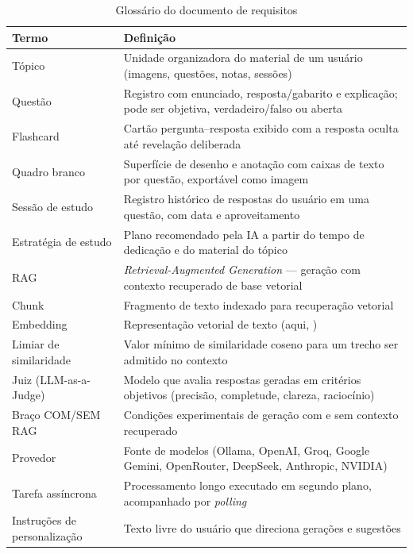 \begin{table}[H]
\centering
\setlength{\tabcolsep}{3pt}
\caption{Glossário do documento de requisitos}
\label{tab:req-glossario}
\begin{tabularx}{\textwidth}{|L{3.6cm}|Y|}
\hline
\textbf{Termo} & \textbf{Definição} \\
\hline
Tópico & Unidade organizadora do material de um usuário (imagens, questões, notas, sessões) \\
\hline
Questão & Registro com enunciado, resposta/gabarito e explicação; pode ser objetiva, verdadeiro/falso ou aberta \\
\hline
Flashcard & Cartão pergunta--resposta exibido com a resposta oculta até revelação deliberada \\
\hline
Quadro branco & Superfície de desenho e anotação com caixas de texto por questão, exportável como imagem \\
\hline
Sessão de estudo & Registro histórico de respostas do usuário em uma questão, com data e aproveitamento \\
\hline
Estratégia de estudo & Plano recomendado pela IA a partir do tempo de dedicação e do material do tópico \\
\hline
RAG & \emph{Retrieval-Augmented Generation} --- geração com contexto recuperado de base vetorial \\
\hline
Chunk & Fragmento de texto indexado para recuperação vetorial \\
\hline
Embedding & Representação vetorial de texto (aqui, \texttt{}) \\
\hline
Limiar de similaridade & Valor mínimo de similaridade coseno para um trecho ser admitido no contexto \\
\hline
Juiz (LLM-as-a-Judge) & Modelo que avalia respostas geradas em critérios objetivos (precisão, completude, clareza, raciocínio) \\
\hline
Braço COM/SEM RAG & Condições experimentais de geração com e sem contexto recuperado \\
\hline
Provedor & Fonte de modelos (Ollama, OpenAI, Groq, Google Gemini, OpenRouter, DeepSeek, Anthropic, NVIDIA) \\
\hline
Tarefa assíncrona & Processamento longo executado em segundo plano, acompanhado por \emph{polling} \\
\hline
Instruções de personalização & Texto livre do usuário que direciona gerações e sugestões \\
\hline
\end{tabularx}
\end{table}

